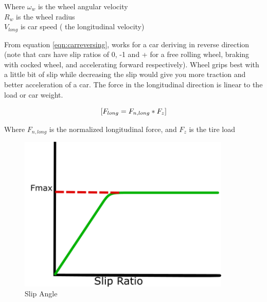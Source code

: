 \documentclass{book}
\begin{document}
\begin{equation}
 [\sigma = (\omega_{w} . R_{w} - V_{lon})/ \mid V_{long} \mid]
 \label{eqn:carreversing}
\end{equation}

Where $\omega_{w}$ is the wheel angular velocity\\
$R_{w}$ is the wheel radius\\
$V_{long}$ is car speed ( the longitudinal velocity)

From equation \ref{eqn:carreversing}, works for a car deriving in reverse direction (note that cars have slip ratios of 0, -1 and + for a free rolling wheel, braking with cocked wheel, and accelerating forward respectively). Wheel grips best with a little bit of slip while decreasing the slip would give you more traction and better acceleration of a car. The force in the longitudinal direction is linear to the load or car weight.

\begin{equation}
 \mbox [F_{long} = F_{n, long} * F_{z} ]
\end{equation}

Where $F_{n, long}$ is the normalized longitudinal force, and $ F_{z} $ is the tire load


\begin{figure}[htbp]
  \centering
  \includegraphics[width=0.9\textwidth]{text3784}
  \caption{Slip Angle}
\end{figure}
\end{document}
